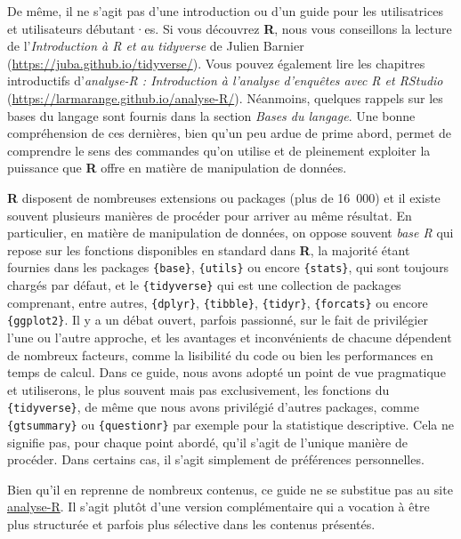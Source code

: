 \documentclass[
  letterpaper,
  DIV=11,
  numbers=noendperiod,
  oneside]{scrreprt}
\begin{document}
De même, il ne s'agit pas d'une introduction ou d'un guide pour les
utilisatrices et utilisateurs débutant·es. Si vous découvrez \textbf{R},
nous vous conseillons la lecture de l'\emph{Introduction à R et au
tidyverse} de Julien Barnier (\url{https://juba.github.io/tidyverse/}).
Vous pouvez également lire les chapitres introductifs d'\emph{analyse-R
: Introduction à l'analyse d'enquêtes avec R et RStudio}
(\url{https://larmarange.github.io/analyse-R/}). Néanmoins, quelques
rappels sur les bases du langage sont fournis dans la section
\emph{Bases du langage}. Une bonne compréhension de ces dernières, bien
qu'un peu ardue de prime abord, permet de comprendre le sens des
commandes qu'on utilise et de pleinement exploiter la puissance que
\textbf{R} offre en matière de manipulation de données.

\textbf{R} disposent de nombreuses extensions ou packages (plus de
16~000) et il existe souvent plusieurs manières de procéder pour arriver
au même résultat. En particulier, en matière de manipulation de données,
on oppose souvent \emph{base R} qui repose sur les fonctions
disponibles en standard dans \textbf{R}, la majorité étant fournies dans
les packages \texttt{\{base\}}, \texttt{\{utils\}} ou encore
\texttt{\{stats\}}, qui sont toujours chargés par défaut, et le
\texttt{\{tidyverse\}} qui est une collection de packages comprenant,
entre autres, \texttt{\{dplyr\}}, \texttt{\{tibble\}},
\texttt{\{tidyr\}}, \texttt{\{forcats\}} ou encore \texttt{\{ggplot2\}}.
Il y a un débat ouvert, parfois passionné, sur le fait de privilégier
l'une ou l'autre approche, et les avantages et inconvénients de chacune
dépendent de nombreux facteurs, comme la lisibilité du code ou bien les
performances en temps de calcul. Dans ce guide, nous avons adopté un
point de vue pragmatique et utiliserons, le plus souvent mais pas
exclusivement, les fonctions du \texttt{\{tidyverse\}}, de même que nous
avons privilégié d'autres packages, comme \texttt{\{gtsummary\}} ou
\texttt{\{questionr\}} par exemple pour la statistique descriptive. Cela
ne signifie pas, pour chaque point abordé, qu'il s'agit de l'unique
manière de procéder. Dans certains cas, il s'agit simplement de
préférences personnelles.

Bien qu'il en reprenne de nombreux contenus, ce guide ne se substitue
pas au site \href{https://larmarange.github.io/analyse-R/}{analyse-R}.
Il s'agit plutôt d'une version complémentaire qui a vocation à être plus
structurée et parfois plus sélective dans les contenus présentés.
\end{document}
